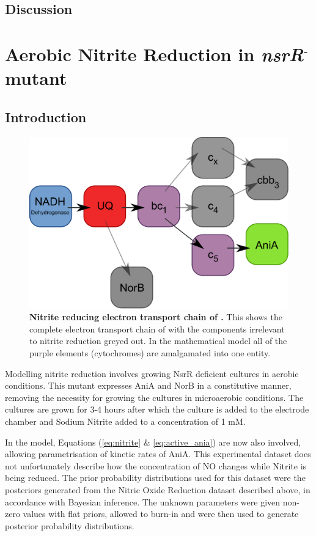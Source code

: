 \subsection{Discussion}
\section{\texorpdfstring{Aerobic Nitrite Reduction in \textit{nsrR$^\textrm{-}$} mutant}{Aerobic Nitrite Reduction in nsrR- mutant}}
\subsection{Introduction}
\begin{figure}[tbp]
  \centering
    \includegraphics[width=14cm]{07-nitritereduction/data/no2_resp_chain.pdf}
    \caption[Nitrite reducing electron transport chain of \Nm{}]{{\bf Nitrite reducing electron transport chain of \Nm{}.} This shows the complete electron transport chain of \Nsm{} with the components irrelevant to nitrite reduction greyed out. In the mathematical model all of the purple elements (cytochromes) are amalgamated into one entity.
  \label{fig:no2_resp_chain}}
\end{figure}
Modelling nitrite reduction involves growing NsrR deficient cultures in aerobic conditions. This mutant expresses AniA and NorB in a constitutive manner, removing the necessity for growing the cultures in microaerobic conditions. The cultures are grown for 3-4 hours after which the culture is added to the electrode chamber and Sodium Nitrite added to a concentration of 1 mM.

In the model, Equations (\ref{eq:nitrite} \& \ref{eq:active_ania}) are now also involved, allowing parametrisation of kinetic rates of AniA. This experimental dataset does not unfortunately describe how the concentration of NO changes while Nitrite is being reduced. The prior probability distributions used for this dataset were the posteriors generated from the Nitric Oxide Reduction dataset described above, in accordance with Bayesian inference. The unknown parameters were given non-zero values with flat priors, allowed to burn-in and were then used to generate posterior probability distributions.

